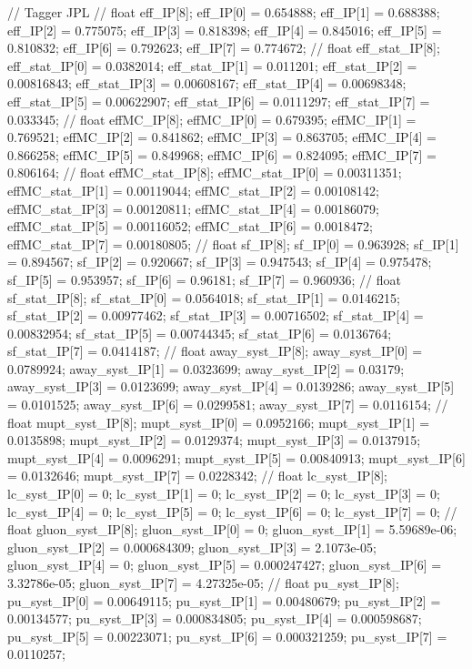 // Tagger JPL
// float eff_IP[8];
eff_IP[0] = 0.654888; eff_IP[1] = 0.688388; eff_IP[2] = 0.775075; 
eff_IP[3] = 0.818398; eff_IP[4] = 0.845016; eff_IP[5] = 0.810832; 
eff_IP[6] = 0.792623; eff_IP[7] = 0.774672; 
// float eff_stat_IP[8];
eff_stat_IP[0] = 0.0382014; eff_stat_IP[1] = 0.011201; eff_stat_IP[2] = 0.00816843; 
eff_stat_IP[3] = 0.00608167; eff_stat_IP[4] = 0.00698348; eff_stat_IP[5] = 0.00622907; 
eff_stat_IP[6] = 0.0111297; eff_stat_IP[7] = 0.033345; 
// float effMC_IP[8];
effMC_IP[0] = 0.679395; effMC_IP[1] = 0.769521; effMC_IP[2] = 0.841862; 
effMC_IP[3] = 0.863705; effMC_IP[4] = 0.866258; effMC_IP[5] = 0.849968; 
effMC_IP[6] = 0.824095; effMC_IP[7] = 0.806164; 
// float effMC_stat_IP[8];
effMC_stat_IP[0] = 0.00311351; effMC_stat_IP[1] = 0.00119044; effMC_stat_IP[2] = 0.00108142; 
effMC_stat_IP[3] = 0.00120811; effMC_stat_IP[4] = 0.00186079; effMC_stat_IP[5] = 0.00116052; 
effMC_stat_IP[6] = 0.0018472; effMC_stat_IP[7] = 0.00180805; 
// float sf_IP[8];
sf_IP[0] = 0.963928; sf_IP[1] = 0.894567; sf_IP[2] = 0.920667; 
sf_IP[3] = 0.947543; sf_IP[4] = 0.975478; sf_IP[5] = 0.953957; 
sf_IP[6] = 0.96181; sf_IP[7] = 0.960936; 
// float sf_stat_IP[8];
sf_stat_IP[0] = 0.0564018; sf_stat_IP[1] = 0.0146215; sf_stat_IP[2] = 0.00977462; 
sf_stat_IP[3] = 0.00716502; sf_stat_IP[4] = 0.00832954; sf_stat_IP[5] = 0.00744345; 
sf_stat_IP[6] = 0.0136764; sf_stat_IP[7] = 0.0414187; 
// float away_syst_IP[8];
away_syst_IP[0] = 0.0789924; away_syst_IP[1] = 0.0323699; away_syst_IP[2] = 0.03179; 
away_syst_IP[3] = 0.0123699; away_syst_IP[4] = 0.0139286; away_syst_IP[5] = 0.0101525; 
away_syst_IP[6] = 0.0299581; away_syst_IP[7] = 0.0116154; 
// float mupt_syst_IP[8];
mupt_syst_IP[0] = 0.0952166; mupt_syst_IP[1] = 0.0135898; mupt_syst_IP[2] = 0.0129374; 
mupt_syst_IP[3] = 0.0137915; mupt_syst_IP[4] = 0.0096291; mupt_syst_IP[5] = 0.00840913; 
mupt_syst_IP[6] = 0.0132646; mupt_syst_IP[7] = 0.0228342; 
// float lc_syst_IP[8];
lc_syst_IP[0] = 0; lc_syst_IP[1] = 0; lc_syst_IP[2] = 0; 
lc_syst_IP[3] = 0; lc_syst_IP[4] = 0; lc_syst_IP[5] = 0; 
lc_syst_IP[6] = 0; lc_syst_IP[7] = 0; 
// float gluon_syst_IP[8];
gluon_syst_IP[0] = 0; gluon_syst_IP[1] = 5.59689e-06; gluon_syst_IP[2] = 0.000684309; 
gluon_syst_IP[3] = 2.1073e-05; gluon_syst_IP[4] = 0; gluon_syst_IP[5] = 0.000247427; 
gluon_syst_IP[6] = 3.32786e-05; gluon_syst_IP[7] = 4.27325e-05; 
// float pu_syst_IP[8];
pu_syst_IP[0] = 0.00649115; pu_syst_IP[1] = 0.00480679; pu_syst_IP[2] = 0.00134577; 
pu_syst_IP[3] = 0.000834805; pu_syst_IP[4] = 0.000598687; pu_syst_IP[5] = 0.00223071; 
pu_syst_IP[6] = 0.000321259; pu_syst_IP[7] = 0.0110257; 
